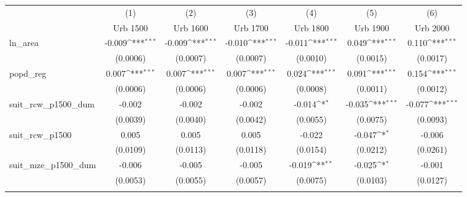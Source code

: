 {
\def\sym#1{\ifmmode^{#1}\else\(^{#1}\)\fi}
\begin{tabular}{l*{6}{c}}
\toprule
                    &\multicolumn{1}{c}{(1)}&\multicolumn{1}{c}{(2)}&\multicolumn{1}{c}{(3)}&\multicolumn{1}{c}{(4)}&\multicolumn{1}{c}{(5)}&\multicolumn{1}{c}{(6)}\\
                    &\multicolumn{1}{c}{Urb 1500}&\multicolumn{1}{c}{Urb 1600}&\multicolumn{1}{c}{Urb 1700}&\multicolumn{1}{c}{Urb 1800}&\multicolumn{1}{c}{Urb 1900}&\multicolumn{1}{c}{Urb 2000}\\
\midrule
ln\_area             &      -0.009\sym{***}&      -0.009\sym{***}&      -0.010\sym{***}&      -0.011\sym{***}&       0.049\sym{***}&       0.110\sym{***}\\
                    &    (0.0006)         &    (0.0007)         &    (0.0007)         &    (0.0010)         &    (0.0015)         &    (0.0017)         \\
\addlinespace
popd\_reg            &       0.007\sym{***}&       0.007\sym{***}&       0.007\sym{***}&       0.024\sym{***}&       0.091\sym{***}&       0.154\sym{***}\\
                    &    (0.0006)         &    (0.0006)         &    (0.0006)         &    (0.0008)         &    (0.0011)         &    (0.0012)         \\
\addlinespace
suit\_rcw\_p1500\_dum  &      -0.002         &      -0.002         &      -0.002         &      -0.014\sym{*}  &      -0.035\sym{***}&      -0.077\sym{***}\\
                    &    (0.0039)         &    (0.0040)         &    (0.0042)         &    (0.0055)         &    (0.0075)         &    (0.0093)         \\
\addlinespace
suit\_rcw\_p1500      &       0.005         &       0.005         &       0.005         &      -0.022         &      -0.047\sym{*}  &      -0.006         \\
                    &    (0.0109)         &    (0.0113)         &    (0.0118)         &    (0.0154)         &    (0.0212)         &    (0.0261)         \\
\addlinespace
suit\_mze\_p1500\_dum  &      -0.006         &      -0.005         &      -0.005         &      -0.019\sym{**} &      -0.025\sym{*}  &      -0.001         \\
                    &    (0.0053)         &    (0.0055)         &    (0.0057)         &    (0.0075)         &    (0.0103)         &    (0.0127)         \\
\addlinespace

\end{tabular}}
